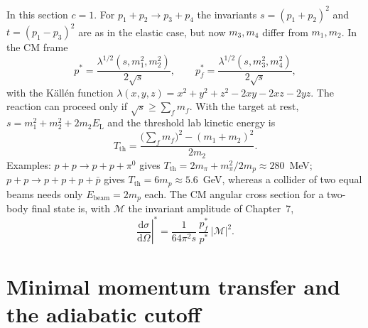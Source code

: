 \documentclass[11pt,a4paper]{book}
\numberwithin{equation}{chapter}
\newcommand{\dd}{\mathrm{d}}
\newcommand{\dsdO}{\frac{\dd\sigma}{\dd\Omega}}
\begin{document}
In this section $c=1$. For $p_1+p_2\to p_3+p_4$ the invariants
$s=(p_1+p_2)^2$ and $t=(p_1-p_3)^2$ are as in the elastic case, but now
$m_3,m_4$ differ from $m_1,m_2$. In the CM frame
\begin{equation}\label{eq:rel-pstar}
  p^*=\frac{\lambda^{1/2}(s,m_1^2,m_2^2)}{2\sqrt s},\qquad
  p_f^*=\frac{\lambda^{1/2}(s,m_3^2,m_4^2)}{2\sqrt s},
\end{equation}
with the K\"all\'en function
$\lambda(x,y,z)=x^2+y^2+z^2-2xy-2xz-2yz$. The reaction can proceed only if
$\sqrt s\ge\sum_fm_f$. With the target at rest, $s=m_1^2+m_2^2+2m_2E_{\mathrm L}$
and the threshold lab kinetic energy is
\begin{equation}\label{eq:Tth}
  T_{\mathrm{th}}=\frac{\bigl(\sum_fm_f\bigr)^2-(m_1+m_2)^2}{2m_2}.
\end{equation}
Examples: $p+p\to p+p+\pi^0$ gives $T_{\mathrm{th}}=2m_\pi+m_\pi^2/2m_p\approx280$~MeV;
$p+p\to p+p+p+\bar p$ gives $T_{\mathrm{th}}=6m_p\approx5.6$~GeV, whereas a collider
of two equal beams needs only $E_{\mathrm{beam}}=2m_p$ each. The CM angular cross
section for a two-body final state is, with $\mathcal M$ the invariant amplitude
of Chapter~7,
\begin{equation}\label{eq:rel-inel-xs}
  \left.\dsdO\right|^*=\frac{1}{64\pi^2s}\,\frac{p_f^*}{p^*}\,|\mathcal M|^2 .
\end{equation}

\section{Minimal momentum transfer and the adiabatic cutoff}\label{sec:qmin}
\end{document}
